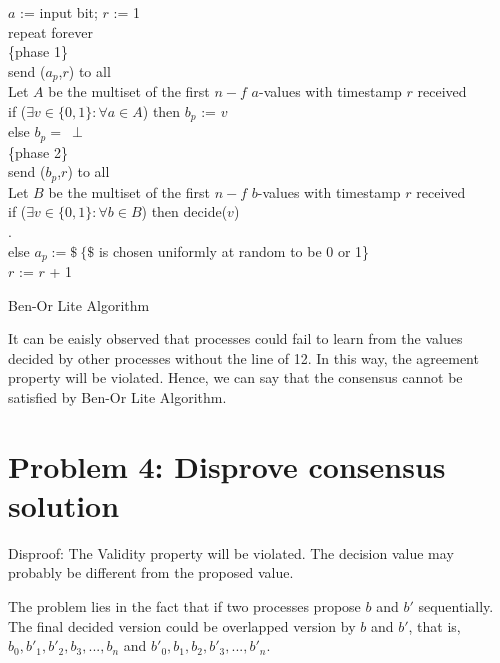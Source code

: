 \documentclass[11pt,a4paper]{article}
\begin{document}
\begin{algorithm}[H]
    $a$ := input bit; $r$ := 1 \\
    repeat forever \\
    \{phase 1\} \\
    send ($a_p$,$r$) to all \\
    Let $A$ be the multiset of the first $n-f$ $a$-values with timestamp $r$ received \\
    if ($\exists v \in \{0, 1\}: \forall a \in A$) then $b_p$ := $v$ \\
    else $b_p =\ \perp$ \\
    \{phase 2\} \\
    send ($b_p$,$r$) to all \\
    Let $B$ be the multiset of the first $n-f$ $b$-values with timestamp $r$ received \\
    if ($\exists v \in \{0, 1\}: \forall b \in B$) then  decide($v$) \\
    . \\
    else $a_p := \$ \ \{\$$ is chosen uniformly at random to be 0 or 1\} \\
    $r$ := $r$ + 1
    \caption{Ben-Or Lite Algorithm}
\end{algorithm}

\vspace{0.3cm}

It can be eaisly observed that processes could fail to learn from the values
decided by other processes without the line of 12. In this way, the agreement
property will be violated. Hence, we can say that the consensus cannot be
satisfied by Ben-Or Lite Algorithm.

\section{Problem 4: Disprove consensus solution}
Disproof: The Validity property will be violated. 
The decision value may probably be different from the proposed value.

The problem lies in the fact that if two processes propose $b$ and $b'$
sequentially. The final decided version could be overlapped version by $b$ and
$b'$, that is, $b_0,b'_1,b'_2,b_3,...,b_n$ and $b'_0,b_1,b_2,b'_3,...,b'_n$. 

\end{document}
